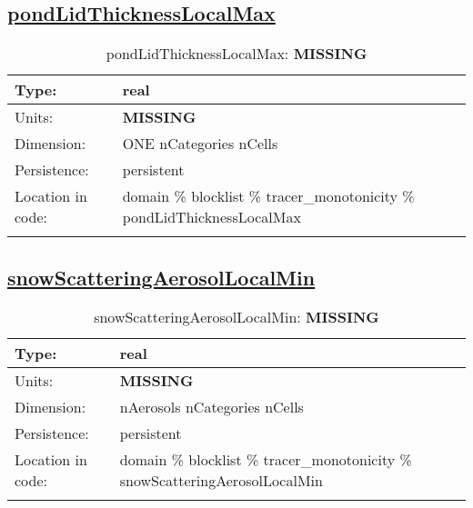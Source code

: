 \subsection[pondLidThicknessLocalMax]{\hyperref[sec:var_tab_tracer_monotonicity]{pondLidThicknessLocalMax}}
\label{subsec:var_sec_tracer_monotonicity_pondLidThicknessLocalMax}
\begin{center}
\begin{longtable}{| p{2.0in} | p{4.0in} |}
        \hline 
        Type: & real \\
        \hline 
        Units: & {\bf \color{red} MISSING} \\
        \hline 
        Dimension: & ONE nCategories nCells \\
        \hline 
        Persistence: & persistent \\
        \hline 
         Location in code: & domain \% blocklist \% tracer\_monotonicity \% pondLidThicknessLocalMax \\
         \hline 
    \caption{pondLidThicknessLocalMax: {\bf \color{red} MISSING}}
\end{longtable}
\end{center}
\subsection[snowScatteringAerosolLocalMin]{\hyperref[sec:var_tab_tracer_monotonicity]{snowScatteringAerosolLocalMin}}
\label{subsec:var_sec_tracer_monotonicity_snowScatteringAerosolLocalMin}
\begin{center}
\begin{longtable}{| p{2.0in} | p{4.0in} |}
        \hline 
        Type: & real \\
        \hline 
        Units: & {\bf \color{red} MISSING} \\
        \hline 
        Dimension: & nAerosols nCategories nCells \\
        \hline 
        Persistence: & persistent \\
        \hline 
         Location in code: & domain \% blocklist \% tracer\_monotonicity \% snowScatteringAerosolLocalMin \\
         \hline 
    \caption{snowScatteringAerosolLocalMin: {\bf \color{red} MISSING}}
\end{longtable}
\end{center}

